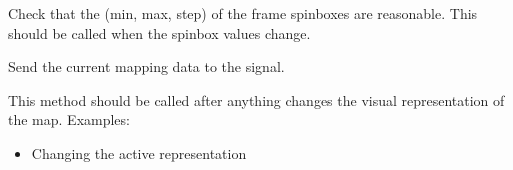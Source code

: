 \documentclass[letterpaper,10pt,english]{sphinxmanual}
\begin{document}
\begin{fulllineitems}
\begin{fulllineitems}
\label{\detokenize{xanespy:xanespy.qt_frameset_presenter.QtFramesetPresenter.toggle_edge_mask}}
\end{fulllineitems}


\begin{fulllineitems}
\label{\detokenize{xanespy:xanespy.qt_frameset_presenter.QtFramesetPresenter.toggle_spectrum_fit}}
\end{fulllineitems}


\begin{fulllineitems}
\label{\detokenize{xanespy:xanespy.qt_frameset_presenter.QtFramesetPresenter.update_frame_range_limits}}
Check that the (min, max, step) of the frame spinboxes are
reasonable. This should be called when the spinbox values change.

\end{fulllineitems}


\begin{fulllineitems}
\label{\detokenize{xanespy:xanespy.qt_frameset_presenter.QtFramesetPresenter.update_map_limits}}
\end{fulllineitems}


\begin{fulllineitems}
\label{\detokenize{xanespy:xanespy.qt_frameset_presenter.QtFramesetPresenter.update_maps}}
Send the current mapping data to the  signal.

This method should be called after anything changes the visual
representation of the map. Examples:
\begin{itemize}
\item {} 
Changing the active representation


\end{itemize}
\end{fulllineitems}
\end{fulllineitems}
\end{document}
